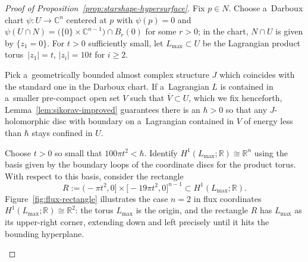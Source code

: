 \documentclass[pdftex]{sigma}
\numberwithin{equation}{section}
\newcommand{\bC}{{\mathbb C}}
\newcommand{\bR}{{\mathbb R}}
\theoremstyle{definition}
\begin{document}
\begin{proof}[Proof of Proposition~\ref{prop:starshape-hypersurface}]
 Fix $p\in N$. Choose a~Darboux chart $\psi\colon U\to\bC^n$ centered at $p$ with $\psi(p)=0$ and $\psi(U\cap N)=\bigl(\{0\}\times\bC^{n-1}\bigr)\cap B_r(0)$ for some $r>0$; in the chart, $N\cap U$ is given by $\{z_1=0\}$.
 For $t>0$ sufficiently small, let $L_{\max}\subset U$ be the Lagrangian product torus~${|z_1|=t}$, $|z_i|=10t$ for $i\ge 2$.

 Pick a~geometrically bounded almost complex structure $J$ which coincides with the standard one in the Darboux chart. If a~Lagrangian $L$ is contained in a~smaller pre-compact open set $V$ such that $\overline{V}\subset U$, which we fix henceforth, Lemma~\ref{lem:sikorav-improved} guarantees there is an $\hbar>0$ so that any $J$-holomorphic disc with boundary on a~Lagrangian contained in $V$ of energy less than $\hbar$ stays confined in $U$.

 Choose $t>0$ so small that $100\pi t^2<\hbar$.
 Identify $H^1(L_{\max};\bR)\cong\bR^n$ using the basis given by the boundary loops of the coordinate discs for the product torus.
 With respect to this basis, consider the rectangle
 \[
 R := \bigl(-\pi t^2, 0\bigr] \times \bigl[-19\pi t^2, 0\bigr]^{n-1} \subset H^1(L_{\max};\bR).
 \]
 Figure~\ref{fig:flux-rectangle} illustrates the case $n=2$ in flux coordinates $H^1(L_{\max};\bR)\cong\bR^2$: the torus $L_{\max}$ is the origin, and the rectangle $R$ has $L_{\max}$ as its upper-right corner, extending down and left precisely until it hits the bounding hyperplane.

 \begin{figure}[ht]
 \centering
\end{figure}
\end{proof}
\end{document}

